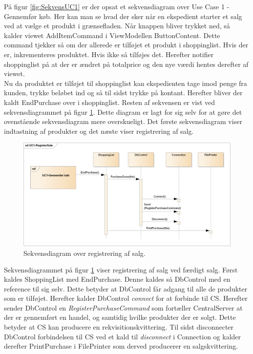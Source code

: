 På figur \ref{fig:SekvensUC1} er der opsat et sekvensdiagram over Use Case 1 - Gennemfør køb. Her kan man se hvad der sker når en ekspedient starter et salg ved at vælge et produkt i grænsefladen. Når knappen bliver trykket ned, så kalder viewet AddItemCommand i ViewModellen ButtonContent. Dette command tjekker så om der allerede er tilføjet et produkt i shoppinglist. Hvis der er, inkrementeres produktet. Hvis ikke så tilføjes det. Herefter notifier shoppinglist på at der er ændret på totalprice og den nye værdi hentes derefter af viewet. \\
Nu da produktet er tilføjet til shoppinglist kan ekspedienten tage imod penge fra kunden, trykke beløbet ind og så til sidst trykke på kontant. Herefter bliver der kaldt EndPurchase over i shoppinglist. Resten af sekvensen er vist ved sekvensdiagrammet på figur \ref{fig:SekvensRegisterSale}. Dette diagram er lagt for sig selv for at gøre det ovenstående sekvensdiagram mere overskueligt. Det første sekvensdiagram viser indtastning af produkter og det næste viser registrering af salg.

\begin{figure}[H]
	\centering
	\includegraphics[width=1\textwidth]{Systemdesign/Frontend/GUI/DesignOgStruktur/Pics/RegisterSale}
	\caption{Sekvensdiagram over registrering af salg.}
	\label{fig:SekvensRegisterSale}
\end{figure}

Sekvensdiagrammet på figur \ref{fig:SekvensRegisterSale} viser registrering af salg ved færdigt salg. Først kaldes ShoppingList med EndPurchase. Denne kaldes så DbControl med en reference til sig selv. Dette betyder at DbControl får adgang til alle de produkter som er tilføjet. Herefter kalder DbControl \textit{connect} for at forbinde til \gls{CS}. Herefter sender DbControl en \textit{RegisterPurchaseCommand} som fortæller CentralServer at der er gennemført en handel, og samtidig hvilke produkter der er solgt. Dette betyder at \gls{CS} kan producere en rekvisitionskvittering. Til sidst disconnecter DbControl forbindelsen til \gls{CS} ved et kald til \textit{disconnect} i Connection og kalder derefter PrintPurchase i FilePrinter som derved producerer en salgskvittering.

